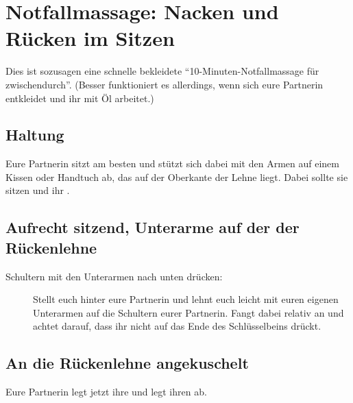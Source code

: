 \section{Notfallmassage: Nacken und Rücken im Sitzen}

Dies ist sozusagen eine schnelle bekleidete "`10-Minuten-Notfallmassage für zwischendurch"'. (Besser funktioniert es allerdings, wenn sich eure Partnerin entkleidet und ihr mit Öl arbeitet.)

\subsection{Haltung}

Eure Partnerin sitzt am besten  und stützt sich dabei mit den Armen auf einem Kissen oder Handtuch ab, das auf der Oberkante der Lehne liegt. Dabei sollte sie  sitzen und ihr .

\subsection{Aufrecht sitzend, Unterarme auf der der Rückenlehne}

\begin{description}
  \item [Schultern mit den Unterarmen nach unten drücken:] Stellt euch hinter eure Partnerin und lehnt euch leicht mit euren eigenen Unterarmen auf die Schultern eurer Partnerin. Fangt dabei relativ  an und achtet darauf, dass ihr nicht auf das Ende des Schlüsselbeins drückt.
\end{description}

\pagebreak
\subsection{An die Rückenlehne angekuschelt}

Eure Partnerin legt jetzt ihre  und legt ihren  ab.

